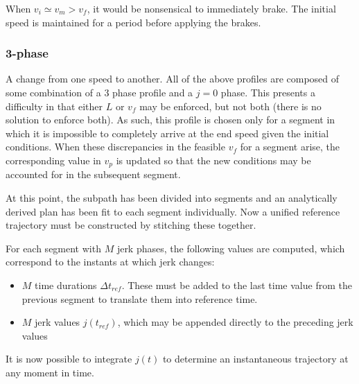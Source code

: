 \documentclass[letterpaper, 10 pt, conference]{ieeeconf}  %
\begin{document}
When $v_i \simeq v_m > v_f$, it would be nonsensical to immediately brake.
The initial speed is maintained for a period before applying the brakes.


\subsubsection{3-phase} \label{sec:3phase}

A change from one speed to another.
All of the above profiles are composed of some combination of a 3 phase profile and a $j = 0$ phase.
This presents a difficulty in that either $L$ or $v_f$ may be enforced, but not both (there is no solution to enforce both).
As such, this profile is chosen only for a segment in which it is impossible to completely arrive at the end speed given the initial conditions.
When these discrepancies in the feasible $v_f$ for a segment arise, the corresponding value in $v_p$ is updated so that the new conditions may be accounted for in the subsequent segment.


At this point, the subpath has been divided into segments and an analytically derived plan has been fit to each segment individually.
Now a unified reference trajectory must be constructed by stitching these together.

For each segment with $M$ jerk phases, the following values are computed, which correspond to the instants at which jerk changes:
\begin{itemize}
  \item $M$ time durations $\Delta t_{ref}$. These must be added to the last time value from the previous segment to translate them into reference time.
  \item $M$ jerk values $j(t_{ref})$, which may be appended directly to the preceding jerk values
\end{itemize}
It is now possible to integrate $j(t)$ to determine an instantaneous trajectory at any moment in time.

\end{document}
